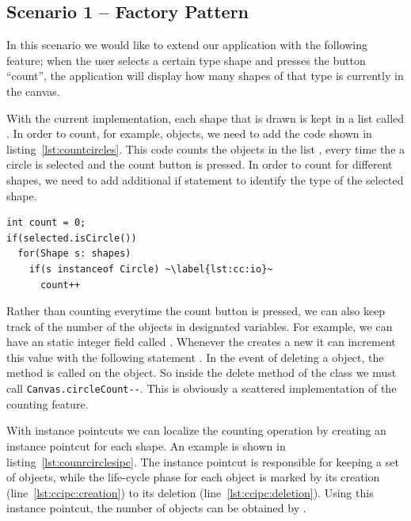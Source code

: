 \subsection{Scenario 1 -- Factory Pattern}
In this scenario we would like to extend our application with the following feature; when the user selects a certain type shape and presses the button ``count'', the application will display how many shapes of that type is currently in the canvas. 

With the current implementation, each shape that is drawn is kept in a list called .
In order to count, for example,  objects, we need to add the code shown in listing~\ref{lst:countcircles}.
This code counts the  objects in the list , every time the a circle is selected and the count button is pressed.
In order to count for different shapes, we need to add additional if statement to identify the type of the selected shape. 

\begin{lstlisting}[float, label={lst:countcircles}, caption={A code snippet for counting \lstinln{Circle} objects}]
int count = 0;
if(selected.isCircle())
  for(Shape s: shapes)
    if(s instanceof Circle) ~\label{lst:cc:io}~
      count++
\end{lstlisting}

Rather than counting everytime the count button is pressed, we can also keep track of the number of the objects in designated variables. 
For example, we can have an static integer field called .
Whenever the  creates a new  it can increment this value with the following statement .
In the event of deleting a  object, the method  is called on the object. 
So inside the delete method of the  class we must call \lstinline~Canvas.circleCount--~.
This is obviously a scattered implementation of the counting feature. 

With instance pointcuts we can localize the counting operation by creating an instance pointcut for each shape. 
An example is shown in listing~\ref{lst:counrcirclesipc}. 
The instance pointcut  is responsible for keeping a set of  objects, while the life-cycle phase for each object is marked by its creation (line~\ref{lst:ccipc:creation}) to its deletion (line~\ref{lst:ccipc:deletion}).
Using this instance pointcut, the number of  objects can be obtained by .

